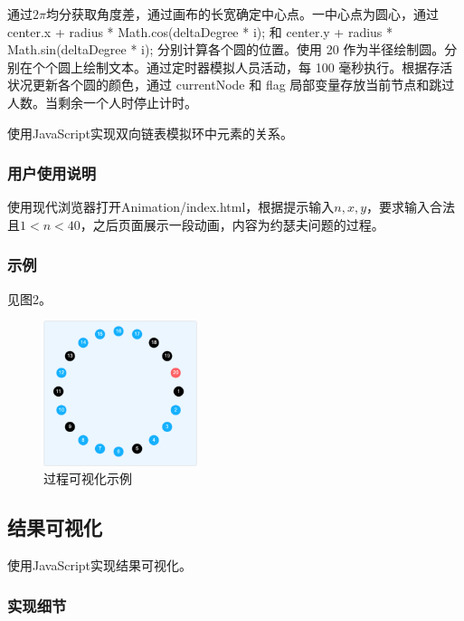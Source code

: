 \documentclass{article}
\begin{document}
通过$2\pi$均分获取角度差，通过画布的长宽确定中心点。一中心点为圆心，通过 center.x + radius * Math.cos(deltaDegree * i); 和 center.y + radius * Math.sin(deltaDegree * i); 分别计算各个圆的位置。使用 20 作为半径绘制圆。分别在个个圆上绘制文本。通过定时器模拟人员活动，每 100 毫秒执行。根据存活状况更新各个圆的颜色，通过 currentNode 和 flag 局部变量存放当前节点和跳过人数。当剩余一个人时停止计时。

使用JavaScript实现双向链表模拟环中元素的关系。

\subsubsection{用户使用说明}

使用现代浏览器打开Animation/index.html，根据提示输入$n, x, y$，要求输入合法且$1 < n < 40$，之后页面展示一段动画，内容为约瑟夫问题的过程。

\subsubsection{示例}

见图2。

\begin{figure}[htbp]
    
    \centering\includegraphics[width=0.4\textwidth]{./Images/Animation.png}
    
    \caption{过程可视化示例}
    
\end{figure}

\subsection{结果可视化}

使用JavaScript实现结果可视化。

\subsubsection{实现细节}
\end{document}
